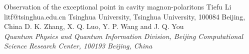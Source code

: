 \begin{conf-abstract}[]
{Observation of the exceptional point in cavity magnon-polaritons}
{\color{blue} Tiefu Li}
{litf@tsinghua.edu.cn}
{Tsinghua University, Tsinghua University, 100084 Beijing, China}
{{\color{blue}D. K. Zhang, X. Q. Luo, Y. P. Wang and J. Q. You}\\ \textit{Quantum Physics and Quantum Information Division, Beijing Computational Science Research Center, 100193 Beijing, China}\\ 
\decofourleft \decofourright}





\printbibliography[heading=none]

\end{conf-abstract}
